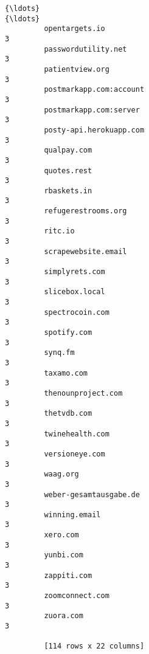 \documentclass[11pt]{article}
\begin{document}
\begin{Verbatim}[commandchars=\\\{\}]
         {\ldots}                                                                {\ldots}  
         opentargets.io                                                       3  
         passwordutility.net                                                  3  
         patientview.org                                                      3  
         postmarkapp.com:account                                              3  
         postmarkapp.com:server                                               3  
         posty-api.herokuapp.com                                              3  
         qualpay.com                                                          3  
         quotes.rest                                                          3  
         rbaskets.in                                                          3  
         refugerestrooms.org                                                  3  
         ritc.io                                                              3  
         scrapewebsite.email                                                  3  
         simplyrets.com                                                       3  
         slicebox.local                                                       3  
         spectrocoin.com                                                      3  
         spotify.com                                                          3  
         synq.fm                                                              3  
         taxamo.com                                                           3  
         thenounproject.com                                                   3  
         thetvdb.com                                                          3  
         twinehealth.com                                                      3  
         versioneye.com                                                       3  
         waag.org                                                             3  
         weber-gesamtausgabe.de                                               3  
         winning.email                                                        3  
         xero.com                                                             3  
         yunbi.com                                                            3  
         zappiti.com                                                          3  
         zoomconnect.com                                                      3  
         zuora.com                                                            3  
         
         [114 rows x 22 columns]
\end{Verbatim}
            
\end{document}

